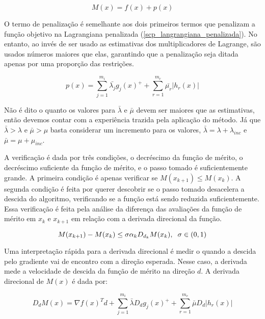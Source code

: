 \begin{equation}
  M(x) = f(x) + p(x)
\end{equation}


O termo de penalização é semelhante aos dois primeiros termos que penalizam a função objetivo
na Lagrangiana penalizada (\ref{scp_langrangiana_penalizada}). No entanto, ao invés de ser
usado as estimativas dos multiplicadores de Lagrange, são usados números maiores que elas,
garantindo que a penalização seja ditada apenas por uma proporção das restrições.


\begin{equation}
 p(x) = \sum_{j=1}^{m_i} \bar{\lambda_j} g_j(x)^+ + \sum_{r=1}^{m_r} \bar{\mu_r} |h_r(x)|
\end{equation}


Não é dito o quanto os valores para \(\bar{\lambda}\) e \(\bar{\mu}\) devem ser maiores que
as estimativas, então devemos contar com a experiência trazida pela aplicação do método.
Já que \(\bar{\lambda} > \lambda\) e \(\bar{\mu} > \mu\) basta considerar um incremento
para os valores, \(\bar{\lambda} = \lambda + \lambda_{inc}\) e  \(\bar{\mu} = \mu + \mu_{inc}\).


A verificação é dada por três condições, o decréscimo da função de mérito, o decréscimo
suficiente da função de mérito, e o passo tomado é suficientemente grande. A primeira
condição é apenas verificar se \(M(x_{k+1}) \leq M(x_k)\). A segunda condição é feita
por querer descobrir se o passo tomado desacelera a descida do algoritmo, verificando
se a função está sendo reduzida suficientemente. Essa verificação é feita pela análise
da diferença das avaliações da função de mérito em \(x_k\) e \(x_{k+1}\) em relação
com a derivada direcional da função.

\begin{equation}
  M(x_{k+1}) - M(x_k) \leq \sigma \alpha_k D_{d_k} M(x_k), \hspace{0.2cm} \sigma \in (0, 1)
\end{equation}

Uma interpretação rápida para a derivada direcional é medir o quando a descida pelo
gradiente vai de encontro com a direção esperada. Nesse caso, a derivada mede a velocidade
de descida da função de mérito na direção \(d\). A derivada direcional de \(M(x)\) é dada
por:

\begin{equation}
  D_d M(x) = \nabla f(x)^Td + \sum_{j=1}^{m_i} \bar{\lambda} D_dg_j(x)^+ +  \sum_{r=1}^{m_e} \bar{\mu} D_d|h_r(x)|
\end{equation}


